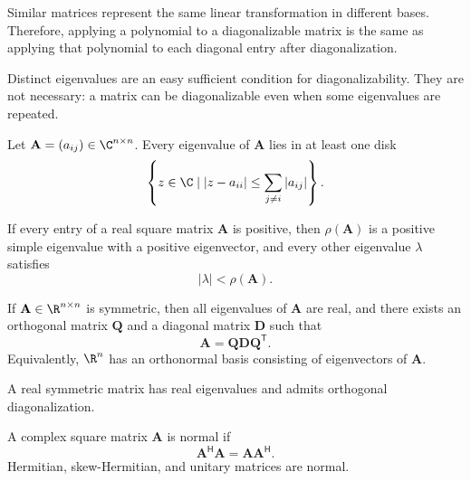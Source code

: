     \begin{idea}
        Similar matrices represent the same linear transformation in different
        bases. Therefore, applying a polynomial to a diagonalizable matrix is
        the same as applying that polynomial to each diagonal entry after
        diagonalization.
    \end{idea}

    \begin{strategy}
        Distinct eigenvalues are an easy sufficient condition for
        diagonalizability. They are not necessary: a matrix can be
        diagonalizable even when some eigenvalues are repeated.
    \end{strategy}

    \begin{theorem}
        Let $\mathbf{A}=(a_{ij})\in\C^{n\times n}$. Every eigenvalue of
        $\mathbf{A}$ lies in at least one disk
        \[
            \left\{z\in\C\mid
            |z-a_{ii}|\leq\sum_{j\neq i}|a_{ij}|
            \right\}.
        \]
    \end{theorem}

    \begin{theorem}
        If every entry of a real square matrix $\mathbf{A}$ is positive, then
        $\rho(\mathbf{A})$ is a positive simple eigenvalue with a positive
        eigenvector, and every other eigenvalue $\lambda$ satisfies
        \[
            |\lambda|<\rho(\mathbf{A}).
        \]
    \end{theorem}

    \begin{theorem}
        If $\mathbf{A}\in\R^{n\times n}$ is symmetric, then all eigenvalues of
        $\mathbf{A}$ are real, and there exists an orthogonal matrix
        $\mathbf{Q}$ and a diagonal matrix $\mathbf{D}$ such that
        \[
            \mathbf{A}
            =
            \mathbf{Q}\mathbf{D}\mathbf{Q}^{\mathsf T}.
        \]
        Equivalently, $\R^n$ has an orthonormal basis consisting of eigenvectors
        of $\mathbf{A}$.
    \end{theorem}

    \begin{remark}
        A real symmetric matrix has real eigenvalues and admits orthogonal
        diagonalization.
    \end{remark}

    \begin{definition}
        A complex square matrix $\mathbf{A}$ is normal if
        \[
            \mathbf{A}^{\mathsf H}\mathbf{A}
            =
            \mathbf{A}\mathbf{A}^{\mathsf H}.
        \]
        Hermitian, skew-Hermitian, and unitary matrices are normal.
    \end{definition}


